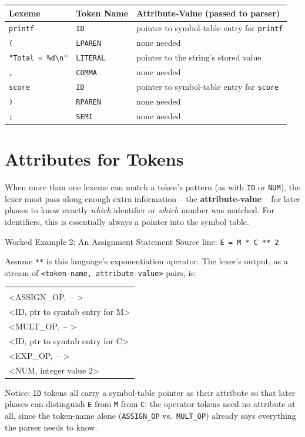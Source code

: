 \documentclass[11pt]{article}
\begin{document}
\begin{center}
\renewcommand{\arraystretch}{1.25}
\begin{tabularx}{\textwidth}{@{}l l X@{}}
\toprule
\textbf{Lexeme} & \textbf{Token Name} & \textbf{Attribute-Value (passed to parser)} \\
\midrule
\texttt{printf} & \texttt{ID} & pointer to symbol-table entry for \texttt{printf} \\
\texttt{(} & \texttt{LPAREN} & none needed \\
\texttt{"Total = \%d\textbackslash n"} & \texttt{LITERAL} & pointer to the string's stored value \\
\texttt{,} & \texttt{COMMA} & none needed \\
\texttt{score} & \texttt{ID} & pointer to symbol-table entry for \texttt{score} \\
\texttt{)} & \texttt{RPAREN} & none needed \\
\texttt{;} & \texttt{SEMI} & none needed \\
\bottomrule
\end{tabularx}
\end{center}

\section{Attributes for Tokens}

\dbtag When more than one lexeme can match a token's pattern (as with \texttt{ID} or
\texttt{NUM}), the lexer must pass along enough extra information -- the \textbf{attribute-value}
-- for later phases to know exactly \emph{which} identifier or \emph{which} number was matched.
For identifiers, this is essentially always a pointer into the symbol table.

\begin{examplebox}{Worked Example 2: An Assignment Statement}
Source line: \quad \texttt{E = M * C ** 2}

Assume \texttt{**} is this language's exponentiation operator. The lexer's output, as a stream
of \texttt{<token-name, attribute-value>} pairs, is:
\begin{center}
\ttfamily
\begin{tabular}{@{}l@{}}
 \\
<ASSIGN\_OP,\ -- >  \\
<ID, ptr to symtab entry for M> \\
<MULT\_OP,\ -- > \\
<ID, ptr to symtab entry for C> \\
<EXP\_OP,\ -- > \\
<NUM, integer value 2>
\end{tabular}
\end{center}
Notice: \texttt{ID} tokens all carry a symbol-table pointer as their attribute so that later
phases can distinguish \texttt{E} from \texttt{M} from \texttt{C}; the operator tokens need no
attribute at all, since the token-name alone (\texttt{ASSIGN\_OP} vs.\ \texttt{MULT\_OP}) already
says everything the parser needs to know.
\end{examplebox}
\end{document}
